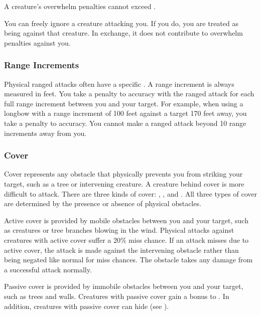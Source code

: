             A creature's overwhelm penalties cannot exceed .

             You can freely ignore a creature attacking you.
            If you do, you are treated as being \unaware against that creature.
            In exchange, it does not contribute to overwhelm penalties against you.

        \subsubsection{Range Increments}\label{Range Increments}
            Physical ranged attacks often have a specific .
            A range increment is always measured in feet.
            You take a  penalty to accuracy with the ranged attack for each full range increment between you and your target.
            For example, when using a longbow with a range increment of 100 feet against a target 170 feet away, you take a  penalty to accuracy.
            You cannot make a ranged attack beyond 10 range increments away from you.

        \subsubsection{Cover}\label{Cover}

            Cover represents any obstacle that physically prevents you from striking your target, such as a tree or intervening creature.
            A creature behind cover is more difficult to attack.
            There are three kinds of cover: , , and .
            All three types of cover are determined by the presence or absence of physical obstacles.

             Active cover is provided by mobile obstacles between you and your target, such as creatures or tree branches blowing in the wind.
            Physical attacks against creatures with active cover suffer a 20\% miss chance.
            If an attack misses due to active cover, the attack is made against the intervening obstacle rather than being negated like normal for miss chances.
            The obstacle takes any damage from a successful attack normally.

             Passive cover is provided by immobile obstacles between you and your target, such as trees and walls.
            Creatures with passive cover gain a  bonus to .
            In addition, creatures with passive cover can hide (see ).

